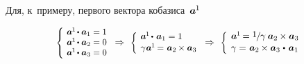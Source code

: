 \begin{otherlanguage}{russian}
Для, к~примеру, первого вектора кобазиса~${\bm{a}^{\hspace{-0.1ex}1}\hspace{-0.1ex}}$

\nopagebreak\vspace{-0.1em}\begin{equation*}
\scalebox{0.9}[0.9]{$\left\{\hspace{-0.16em}\begin{array}{l}
\bm{a}^{\hspace{-0.1ex}1} \hspace{-0.2ex} \dotp \bm{a}_{1} = 1 \\
\bm{a}^{\hspace{-0.1ex}1} \hspace{-0.2ex} \dotp \bm{a}_{2} = 0 \\
\bm{a}^{\hspace{-0.1ex}1} \hspace{-0.2ex} \dotp \bm{a}_{3} = 0 \\[.05em]
\end{array}\right.$}
\Rightarrow\hspace{.33em}
%
\scalebox{0.92}[0.92]{$\left\{\hspace{-0.12em}\begin{array}{l}
\bm{a}^{\hspace{-0.1ex}1} \hspace{-0.2ex} \dotp \hspace{.2ex} \bm{a}_{1} = 1 \\[.1em]
\gamma \hspace{.1ex} \bm{a}^{\hspace{-0.1ex}1} \hspace{-0.2ex} = \hspace{.1ex} \bm{a}_2 \hspace{-0.1ex} \times \bm{a}_3 \\[.08em]
\end{array}\right.$}
\Rightarrow\hspace{.33em}
%
\scalebox{0.96}[0.96]{$\left\{\hspace{-0.11em}\begin{array}{l}
\bm{a}^{\hspace{-0.1ex}1} \hspace{-0.2ex} =
\displaystyle \nicefrac{\scalebox{0.95}{$1$}\hspace{.1ex}}{\scalebox{1.02}{$\gamma$}} \hspace{.5ex} \bm{a}_2 \hspace{-0.1ex} \times \bm{a}_3 \hspace{.1ex} \\[.08em]
\gamma = \hspace{.1ex} \bm{a}_2 \hspace{-0.1ex} \times \bm{a}_3 \hspace{.1ex} \dotp \hspace{.25ex} \bm{a}_{1} \\[.08em]
\end{array}\right.$}
\end{equation*}


\end{otherlanguage}
